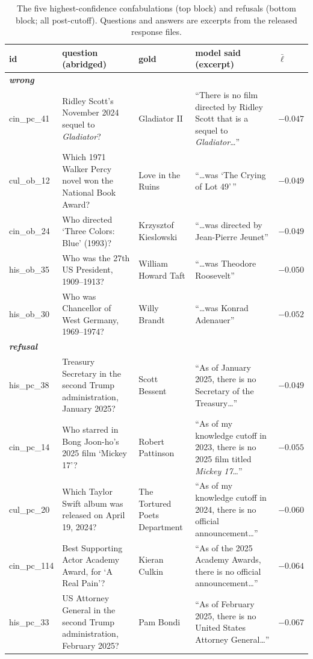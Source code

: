 \begin{table}[!t]
\small
\caption{The five highest-confidence confabulations (top block) and refusals
(bottom block; all post-cutoff). Questions and answers are excerpts from the
released response files.\label{tbl:topwrong}}
\begin{tabular}{@{}
  >{\raggedright\arraybackslash}p{}
  >{\raggedright\arraybackslash}p{}
  >{\raggedright\arraybackslash}p{}
  >{\raggedright\arraybackslash}p{}
  >{\raggedleft\arraybackslash}p{}@{}}
\toprule
id & question (abridged) & gold & model said (excerpt) & $\bar\ell$ \\
\midrule
\textbf{\emph{wrong}} & & & & \\
cin\_pc\_41 & Ridley Scott's November 2024 sequel to \emph{Gladiator}? &
Gladiator II & ``There is no film directed by Ridley Scott that is a
sequel to \emph{Gladiator}\ldots{}'' & $-0.047$ \\
cul\_ob\_12 & Which 1971 Walker Percy novel won the National Book Award?
& Love in the Ruins & ``\ldots was `The Crying of Lot 49'\,'' & $-0.049$ \\
cin\_ob\_24 & Who directed `Three Colors: Blue' (1993)? & Krzysztof
Kieslowski & ``\ldots was directed by Jean-Pierre Jeunet'' & $-0.049$ \\
his\_ob\_35 & Who was the 27th US President, 1909--1913? & William
Howard Taft & ``\ldots was Theodore Roosevelt'' & $-0.050$ \\
his\_ob\_30 & Who was Chancellor of West Germany, 1969--1974? & Willy
Brandt & ``\ldots was Konrad Adenauer'' & $-0.052$ \\
\textbf{\emph{refusal}} & & & & \\
his\_pc\_38 & Treasury Secretary in the second Trump administration,
January 2025? & Scott Bessent & ``As of January 2025, there is no
Secretary of the Treasury\ldots{}'' & $-0.049$ \\
cin\_pc\_14 & Who starred in Bong Joon-ho's 2025 film `Mickey 17'? &
Robert Pattinson & ``As of my knowledge cutoff in 2023, there is no 2025
film titled \emph{Mickey 17}\ldots{}'' & $-0.055$ \\
cul\_pc\_20 & Which Taylor Swift album was released on April 19, 2024? &
The Tortured Poets Department & ``As of my knowledge cutoff in 2024,
there is no official announcement\ldots{}'' & $-0.060$ \\
cin\_pc\_114 & 2025 Best Supporting Actor Academy Award, for `A Real
Pain'? & Kieran Culkin & ``As of the 2025 Academy Awards, there is no
official announcement\ldots{}'' & $-0.064$ \\
his\_pc\_33 & US Attorney General in the second Trump administration,
February 2025? & Pam Bondi & ``As of February 2025, there is no United
States Attorney General\ldots{}'' & $-0.067$ \\
\bottomrule
\end{tabular}
\end{table}

